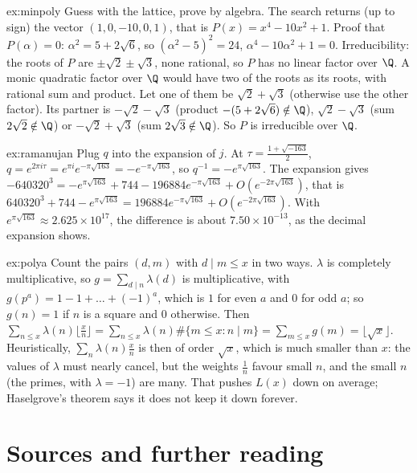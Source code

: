 \begin{solution}{ex:minpoly}
\idea Guess with the lattice, prove by algebra.
\writeup The search returns (up to sign) the vector $(1,0,-10,0,1)$, that is $P(x)=x^4-10x^2+1$. Proof that $P(\alpha)=0$: $\alpha^2=5+2\sqrt6$, so $(\alpha^2-5)^2=24$, $\alpha^4-10\alpha^2+1=0$. Irreducibility: the roots of $P$ are
$\pm\sqrt2\pm\sqrt3$, none rational, so $P$ has no linear factor over $\Q$. A monic quadratic factor over $\Q$ would have two of the roots as its roots, with rational sum and product. Let one of them be
$\sqrt2+\sqrt3$ (otherwise use the other factor). Its partner is $-\sqrt2-\sqrt3$ (product $-(5+2\sqrt6)\notin\Q$), $\sqrt2-\sqrt3$ (sum $2\sqrt2\notin\Q$) or $-\sqrt2+\sqrt3$ (sum $2\sqrt3\notin\Q$). So $P$ is irreducible over $\Q$.
\end{solution}

\begin{solution}{ex:ramanujan}
\idea Plug $q$ into the expansion of $j$.
\writeup At $\tau=\frac{1+\sqrt{-163}}2$, $q=e^{2\pi i\tau}=e^{\pi i}e^{-\pi\sqrt{163}}=-e^{-\pi\sqrt{163}}$, so $q^{-1}=-e^{\pi\sqrt{163}}$. The expansion gives $-640320^3=-e^{\pi\sqrt{163}}+744-196884e^{-\pi\sqrt{163}}+O(e^{-2\pi\sqrt{163}})$,
that is $640320^3+744-e^{\pi\sqrt{163}}=196884e^{-\pi\sqrt{163}}+O(e^{-2\pi\sqrt{163}})$. With $e^{\pi\sqrt{163}}\approx2.625\times10^{17}$, the difference is about $7.50\times10^{-13}$, as the decimal expansion shows.
\end{solution}

\begin{solution}{ex:polya}
\idea Count the pairs $(d,m)$ with $d\mid m\le x$ in two ways.
\writeup $\lambda$ is completely multiplicative, so $g=\sum_{d\mid n}\lambda(d)$ is multiplicative, with $g(p^a)=1-1+\dots+(-1)^a$, which is $1$ for even $a$ and $0$ for odd $a$; so $g(n)=1$ if $n$ is a square and $0$ otherwise.
Then $\sum_{n\le x}\lambda(n)\lfloor\frac xn\rfloor=\sum_{n\le x}\lambda(n)\#\{m\le x:n\mid m\}=\sum_{m\le x}g(m)=\lfloor\sqrt x\rfloor$. Heuristically, $\sum_n\lambda(n)\frac xn$ is then of order $\sqrt x$, which is much smaller than $x$: the
values of $\lambda$ must nearly cancel, but the weights $\frac1n$ favour small $n$, and the small $n$ (the primes, with $\lambda=-1$) are many. That pushes $L(x)$ down on average; Haselgrove's theorem says it
does not keep it down forever.
\end{solution}

\section*{Sources and further reading}

